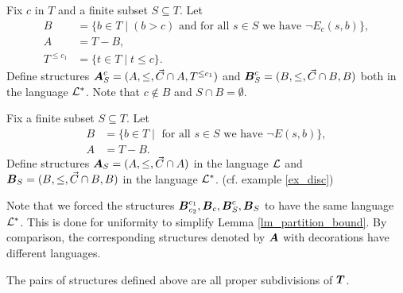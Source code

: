 \begin{Definition}
  Fix $c$ in $T$ and  a finite subset $S \subseteq T$. Let
  \begin{align*}
    B &= \{b \in T \mid (b > c) \text{ and for all $s \in S$ we have } \neg E_c(s, b)\}, \\
    A &= T - B, \\
    T^{\leq c_1} &= \{t \in T \mid t \leq c\}.
  \end{align*}
  Define structures $\operatorname{\boldsymbol A}^{c}_{S} = (A, \leq, \vec C\cap A, T^{\leq c_1})$ and $\operatorname{\boldsymbol B}^{c}_{S} = (B, \leq, \vec C\cap B, B)$ both in the language $\mathcal L^*$.
  Note that $c \notin B$ and $S \cap B = \emptyset$.
\end{Definition}

\begin{Definition}
  Fix  a finite subset $S \subseteq T$. Let
  \begin{align*}
    B &= \{b \in T \mid \text{ for all $s \in S$ we have } \neg E(s, b)\}, \\
    A &= T - B.
  \end{align*}
  Define structures $\operatorname{\boldsymbol A}_{S} = (A, \leq, \vec C \cap A)$ in the language $\mathcal L$ and $\operatorname{\boldsymbol B}_{S} = (B, \leq, \vec C\cap B, B)$ in the language $\mathcal L^*$.
  (cf. example \ref{ex_disc})
\end{Definition}

Note that we forced the structures $\operatorname{\boldsymbol B}^{c_1}_{c_2}, \operatorname{\boldsymbol B}_c, \operatorname{\boldsymbol B}^{c}_{S}, \operatorname{\boldsymbol B}_{S}$ to have the same language $\mathcal L^*$.
This is done for uniformity to simplify Lemma \ref{lm_partition_bound}.
By comparison, the corresponding structures denoted by $\operatorname{\boldsymbol A}$ with decorations have different languages.

\begin{Lemma} \label{subdivide}
  The pairs of structures defined above are all proper subdivisions of $\operatorname{\boldsymbol T}$.
\end{Lemma}

